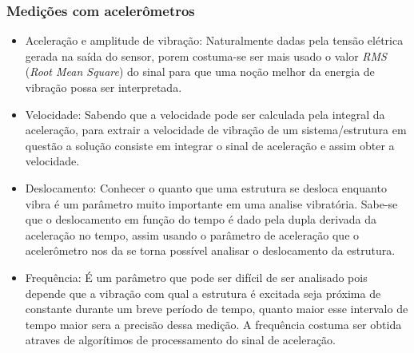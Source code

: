 \subsubsection{Medições com acelerômetros}
\begin{itemize}
  \item Aceleração e amplitude de vibração: Naturalmente dadas pela tensão elétrica gerada na saída do sensor, porem costuma-se ser mais usado o valor \textit{RMS} (\textit{Root Mean Square}) do sinal para que uma noção melhor da energia de vibração possa ser interpretada.
  \item Velocidade: Sabendo que a velocidade pode ser calculada pela integral da aceleração, para extrair a velocidade de vibração de um sistema/estrutura em questão a solução consiste em integrar o sinal de aceleração e assim obter a velocidade.
  \item Deslocamento: Conhecer o quanto que uma estrutura se desloca enquanto vibra é um parâmetro muito importante em uma analise vibratória. Sabe-se que o deslocamento em função do tempo é dado pela dupla derivada da aceleração no tempo, assim usando o parâmetro de aceleração que o acelerômetro nos da se torna possível analisar o deslocamento da estrutura.
  \item Frequência: É um parâmetro que pode ser difícil de ser analisado pois depende que a vibração com qual a estrutura é excitada seja próxima de constante durante um breve período de tempo, quanto maior esse intervalo de tempo maior sera a precisão dessa medição. A frequência costuma ser obtida atraves de algorítimos de processamento do sinal de aceleração.
\end{itemize}